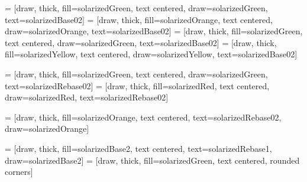  = [draw, thick, fill=solarizedGreen, text centered, draw=solarizedGreen,
    text=solarizedBase02]
 = [draw, thick, fill=solarizedOrange, text centered, draw=solarizedOrange,
    text=solarizedBase02]
 = [draw, thick, fill=solarizedGreen, text centered, draw=solarizedGreen,
    text=solarizedBase02]
 = [draw, thick, fill=solarizedYellow, text centered, draw=solarizedYellow,
    text=solarizedBase02]

 = [draw, thick, fill=solarizedGreen, text centered, draw=solarizedGreen, text=solarizedRebase02]
 = [draw, thick, fill=solarizedRed, text centered, draw=solarizedRed, text=solarizedRebase02]

 = [draw, thick, fill=solarizedOrange, text centered, text=solarizedRebase02, draw=solarizedOrange]

 = [draw, thick, fill=solarizedBase2, text centered, text=solarizedRebase1, draw=solarizedBase2]
 = [draw, thick, fill=solarizedGreen, text centered, rounded corners]
